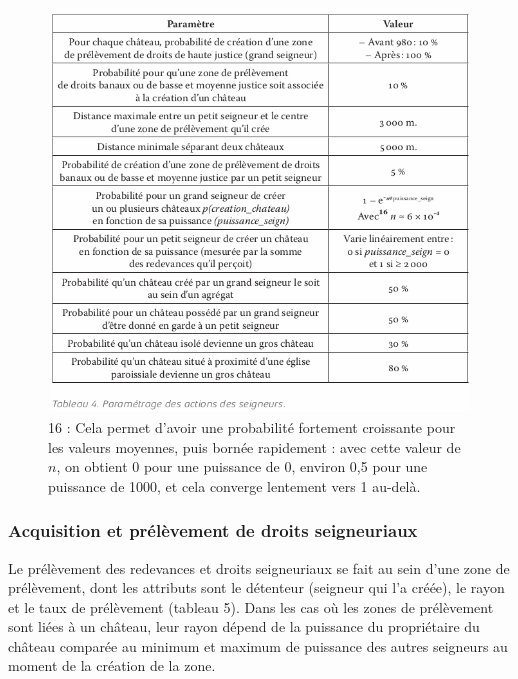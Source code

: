 \documentclass[12pt, a4paper, oneside]{book}
\begin{document}
	\begin{figure}[H]
		\centering
		\includegraphics[width=1\linewidth]{src/Chapitre_TMD/Tab4.png}
				\caption*{
			\small
			16 : Cela permet d’avoir une probabilité fortement croissante pour les valeurs moyennes, puis bornée rapidement : avec cette valeur de $n$, on obtient 0 pour une puissance de 0, environ 0,5 pour une puissance de 1000, et cela converge lentement vers 1 au-delà.
		}
	\end{figure}
	
	\subsubsection{Acquisition et prélèvement de droits seigneuriaux}
	
	Le prélèvement des redevances et droits seigneuriaux se fait au sein d'une zone de prélèvement, dont les attributs sont le détenteur (seigneur qui l'a créée), le rayon et le taux de prélèvement (tableau 5).
	Dans les cas où les zones de prélèvement sont liées à un château, leur rayon dépend de la puissance du propriétaire du château comparée au minimum et maximum de puissance des autres seigneurs au moment de la création de la zone.
	
\end{document}
